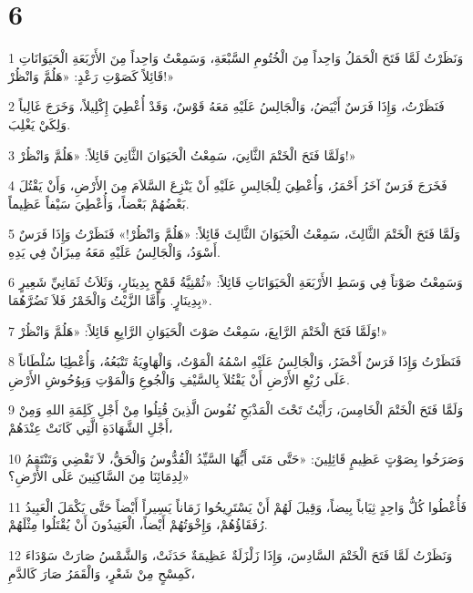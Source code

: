 \chapter{6}

\par 1 وَنَظَرْتُ لَمَّا فَتَحَ الْحَمَلُ وَاحِداً مِنَ الْخُتُومِ السَّبْعَةِ، وَسَمِعْتُ وَاحِداً مِنَ الأَرْبَعَةِ الْحَيَوَانَاتِ قَائِلاً كَصَوْتِ رَعْدٍ: «هَلُمَّ وَانْظُرْ!»
\par 2 فَنَظَرْتُ، وَإِذَا فَرَسٌ أَبْيَضُ، وَالْجَالِسُ عَلَيْهِ مَعَهُ قَوْسٌ، وَقَدْ أُعْطِيَ إِكْلِيلاً، وَخَرَجَ غَالِباً وَلِكَيْ يَغْلِبَ.
\par 3 وَلَمَّا فَتَحَ الْخَتْمَ الثَّانِيَ، سَمِعْتُ الْحَيَوَانَ الثَّانِيَ قَائِلاً: «هَلُمَّ وَانْظُرْ!»
\par 4 فَخَرَجَ فَرَسٌ آخَرُ أَحْمَرُ، وَأُعْطِيَ لِلْجَالِسِ عَلَيْهِ أَنْ يَنْزِعَ السَّلاَمَ مِنَ الأَرْضِ، وَأَنْ يَقْتُلَ بَعْضُهُمْ بَعْضاً، وَأُعْطِيَ سَيْفاً عَظِيماً.
\par 5 وَلَمَّا فَتَحَ الْخَتْمَ الثَّالِثَ، سَمِعْتُ الْحَيَوَانَ الثَّالِثَ قَائِلاً: «هَلُمَّ وَانْظُرْ!» فَنَظَرْتُ وَإِذَا فَرَسٌ أَسْوَدُ، وَالْجَالِسُ عَلَيْهِ مَعَهُ مِيزَانٌ فِي يَدِهِ.
\par 6 وَسَمِعْتُ صَوْتاً فِي وَسَطِ الأَرْبَعَةِ الْحَيَوَانَاتِ قَائِلاً: «ثُمْنِيَّةُ قَمْحٍ بِدِينَارٍ، وَثَلاَثُ ثَمَانِيِّ شَعِيرٍ بِدِينَارٍ. وَأَمَّا الزَّيْتُ وَالْخَمْرُ فَلاَ تَضُرَّهُمَا».
\par 7 وَلَمَّا فَتَحَ الْخَتْمَ الرَّابِعَ، سَمِعْتُ صَوْتَ الْحَيَوَانِ الرَّابِعِ قَائِلاً: «هَلُمَّ وَانْظُرْ!»
\par 8 فَنَظَرْتُ وَإِذَا فَرَسٌ أَخْضَرُ، وَالْجَالِسُ عَلَيْهِ اسْمُهُ الْمَوْتُ، وَالْهَاوِيَةُ تَتْبَعُهُ، وَأُعْطِيَا سُلْطَاناً عَلَى رُبْعِ الأَرْضِ أَنْ يَقْتُلاَ بِالسَّيْفِ وَالْجُوعِ وَالْمَوْتِ وَبِوُحُوشِ الأَرْضِ.
\par 9 وَلَمَّا فَتَحَ الْخَتْمَ الْخَامِسَ، رَأَيْتُ تَحْتَ الْمَذْبَحِ نُفُوسَ الَّذِينَ قُتِلُوا مِنْ أَجْلِ كَلِمَةِ اللهِ وَمِنْ أَجْلِ الشَّهَادَةِ الَّتِي كَانَتْ عِنْدَهُمْ،
\par 10 وَصَرَخُوا بِصَوْتٍ عَظِيمٍ قَائِلِينَ: «حَتَّى مَتَى أَيُّهَا السَّيِّدُ الْقُدُّوسُ وَالْحَقُّ، لاَ تَقْضِي وَتَنْتَقِمُ لِدِمَائِنَا مِنَ السَّاكِنِينَ عَلَى الأَرْضِ؟»
\par 11 فَأُعْطُوا كُلُّ وَاحِدٍ ثِيَاباً بِيضاً، وَقِيلَ لَهُمْ أَنْ يَسْتَرِيحُوا زَمَاناً يَسِيراً أَيْضاً حَتَّى يَكْمَلَ الْعَبِيدُ رُفَقَاؤُهُمْ، وَإِخْوَتُهُمْ أَيْضاً، الْعَتِيدُونَ أَنْ يُقْتَلُوا مِثْلَهُمْ.
\par 12 وَنَظَرْتُ لَمَّا فَتَحَ الْخَتْمَ السَّادِسَ، وَإِذَا زَلْزَلَةٌ عَظِيمَةٌ حَدَثَتْ، وَالشَّمْسُ صَارَتْ سَوْدَاءَ كَمِسْحٍ مِنْ شَعْرٍ، وَالْقَمَرُ صَارَ كَالدَّمِ،
